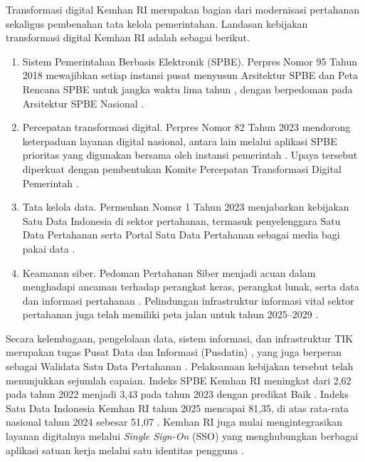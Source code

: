 Transformasi digital Kemhan RI merupakan bagian dari modernisasi pertahanan sekaligus pembenahan tata kelola pemerintahan. Landasan kebijakan transformasi digital Kemhan RI adalah sebagai berikut.

\begin{enumerate}[label=\arabic*.]
\item Sistem Pemerintahan Berbasis Elektronik (SPBE). Perpres\label{sk:Perpres} Nomor 95 Tahun 2018 mewajibkan setiap instansi pusat menyusun Arsitektur SPBE dan Peta Rencana SPBE untuk jangka waktu lima tahun \cite{Perpres95Tahun2018}, dengan berpedoman pada Arsitektur SPBE Nasional \cite{Perpres132Tahun2022}.
\item Percepatan transformasi digital. Perpres Nomor 82 Tahun 2023 mendorong keterpaduan layanan digital nasional, antara lain melalui aplikasi SPBE prioritas yang digunakan bersama oleh instansi pemerintah \cite{Perpres82Tahun2023}. Upaya tersebut diperkuat dengan pembentukan Komite Percepatan Transformasi Digital Pemerintah \cite{Perpres83Tahun2025}.
\item Tata kelola data. Permenhan\label{sk:Permenhan} Nomor 1 Tahun 2023 menjabarkan kebijakan Satu Data Indonesia di sektor pertahanan, termasuk penyelenggara Satu Data Pertahanan serta Portal Satu Data Pertahanan sebagai media bagi pakai data \cite{Permenhan1Tahun2023}.
\item Keamanan siber. Pedoman Pertahanan Siber menjadi acuan dalam menghadapi ancaman terhadap perangkat keras, perangkat lunak, serta data dan informasi pertahanan \cite{Permenhan82Tahun2014}. Pelindungan infrastruktur informasi vital sektor pertahanan juga telah memiliki peta jalan untuk tahun 2025–2029 \cite{Permenhan34Tahun2025}.
\end{enumerate}

Secara kelembagaan, pengelolaan data, sistem informasi, dan infrastruktur TIK\label{sk:TIK} merupakan tugas Pusat Data dan Informasi (Pusdatin\label{sk:Pusdatin}) \cite{Permenhan30Tahun2025}, yang juga berperan sebagai Walidata Satu Data Pertahanan \cite{Pusdatin2026SatuData}. Pelaksanaan kebijakan tersebut telah menunjukkan sejumlah capaian. Indeks SPBE Kemhan RI meningkat dari 2,62 pada tahun 2022 menjadi 3,43 pada tahun 2023 dengan predikat Baik \cite{Pusdatin2024}. Indeks Satu Data Indonesia Kemhan RI tahun 2025 mencapai 81,35, di atas rata-rata nasional tahun 2024 sebesar 51,07 \cite{Pusdatin2026SatuData}. Kemhan RI juga mulai mengintegrasikan layanan digitalnya melalui \textit{Single Sign-On} (SSO\label{sk:SSO}) yang menghubungkan berbagai aplikasi satuan kerja melalui satu identitas pengguna \cite{Pusdatin2026SSO}.

